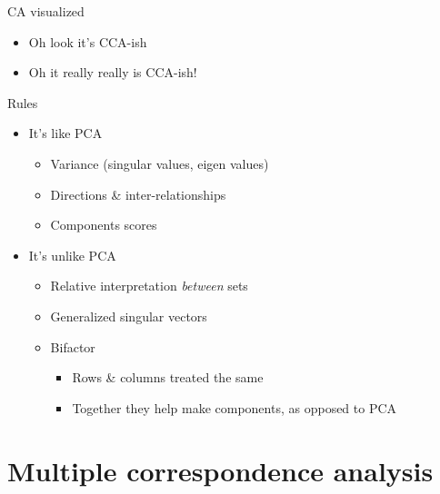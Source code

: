 \documentclass[
  ignorenonframetext,
]{beamer}
\providecommand{\tightlist}{%
  \setlength{\itemsep}{0pt}\setlength{\parskip}{0pt}}
\begin{document}
\begin{frame}{CA visualized}
\protect\hypertarget{ca-visualized}{}

\begin{itemize}[<+->]
\tightlist
\item
  Oh look it's CCA-ish
\item
  Oh it really really is CCA-ish!
\end{itemize}

\end{frame}

\begin{frame}{Rules}
\protect\hypertarget{rules}{}

\begin{itemize}[<+->]
\tightlist
\item
  It's like PCA

  \begin{itemize}[<+->]
  \tightlist
  \item
    Variance (singular values, eigen values)
  \item
    Directions \& inter-relationships
  \item
    Components scores
  \end{itemize}
\item
  It's unlike PCA

  \begin{itemize}[<+->]
  \tightlist
  \item
    Relative interpretation \emph{between} sets
  \item
    Generalized singular vectors
  \item
    Bifactor

    \begin{itemize}[<+->]
    \tightlist
    \item
      Rows \& columns treated the same
    \item
      Together they help make components, as opposed to PCA
    \end{itemize}
  \end{itemize}
\end{itemize}

\end{frame}

\hypertarget{multiple-correspondence-analysis}{%
\section{Multiple correspondence
analysis}\label{multiple-correspondence-analysis}}
\end{document}
